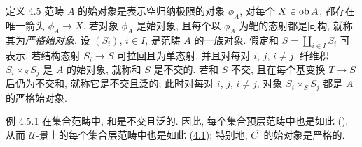 \begin{enonce*}{定义 4.5}
范畴 $A$ 的始对象是表示空归纳极限的对象 $\phi_A$,
\ie 对每个 $X\in \operatorname{ob} A$, 都存在唯一箭头 $\phi_A\rightarrow X$.
若对象 $\phi_A$ 是始对象,
且每个以 $\phi_A$ 为靶的态射都是同构, 就称其为\emph{严格始对象}.
设 $(S_i)$, $i\in I$, 是范畴 $A$ 的一族对象.
假定和 $S=\amalg_{i\in I} S_i$ 可表示.
若结构态射 $S_i\rightarrow S$ 可拉回且为单态射,
并且对每对 $i$, $j$, $i\neq j$,
纤维积 $S_i\times_S S_j$ 是 $A$ 的始对象,
就称和 $S$ 是不交的.
若和 $S$ 不交,
且在每个基变换 $T\rightarrow S$ 后仍为不交和,
就称它是不交且泛的\pageoriginale{};
此时对每对 $i$, $j$, $i\neq j$,
对象 $S_i\times_S S_j$ 都是 $A$ 的严格始对象.
\end{enonce*}

\begin{enonce*}[remark]{例 4.5.1}
在集合范畴中, 和是不交且泛的.
因此, 每个集合预层范畴中也是如此
(),
从而 $𝒰$-景上的每个集合层范畴中也是如此
(\hyperref[II.theo4.1]{4.1});
特别地, $C^{\widetilde{\phantom{,}}}$ 的始对象是严格的.
\end{enonce*}

